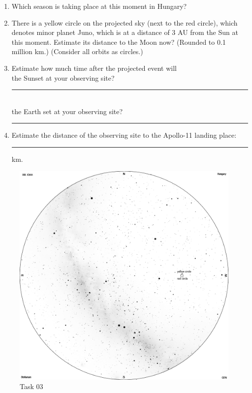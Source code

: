 \documentclass[a4paper,12pt]{extarticle}
\begin{document}
\begin{enumerate}
    \item Which season is taking place at this moment in Hungary?
    \item There is a yellow circle on the projected sky (next to the red circle), which denotes minor planet Juno, which is at a distance of 3 AU from the Sun at this moment. Estimate its distance to the Moon now? (Rounded to 0.1 million km.) (Consider all orbits as circles.)
    \item Estimate how much time after the projected event will\\
the Sunset at your observing site? \rule{3cm}{0.15mm}\\
the Earth set at your observing site? \rule{3cm}{0.15mm}
\item Estimate the distance of the observing site to the Apollo-11 landing place: \rule{1cm}{0.15mm} km.
\end{enumerate}
\begin{figure}[H]
    \centering
    \includegraphics[width=0.95\linewidth]{19_O3.png}
    \caption{Task 03}
\end{figure}
\end{document}
